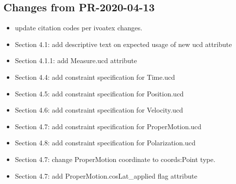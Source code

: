 \documentclass[11pt,a4paper]{ivoa}
\begin{document}
\subsection{Changes from PR-2020-04-13}
\begin{itemize} 
  \item update citation codes per ivoatex changes.
  \item Section 4.1: add descriptive text on expected usage of new ucd attribute
  \item Section 4.1.1: add Measure.ucd attribute
  \item Section 4.4: add constraint specification for Time.ucd
  \item Section 4.5: add constraint specification for Position.ucd
  \item Section 4.6: add constraint specification for Velocity.ucd
  \item Section 4.7: add constraint specification for ProperMotion.ucd
  \item Section 4.8: add constraint specification for Polarization.ucd
  \item Section 4.7: change ProperMotion coordinate to coords:Point type.
  \item Section 4.7: add ProperMotion.cosLat\_applied flag attribute
\end{itemize}





\pagebreak

\end{document}
